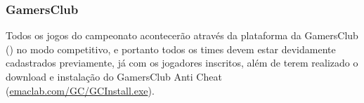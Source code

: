 \subsubsection{GamersClub}

Todos os jogos do campeonato acontecerão através da plataforma da GamersClub () no modo competitivo, e portanto todos os times devem estar devidamente cadastrados previamente, já com os jogadores inscritos, além de terem realizado o download e instalação do GamersClub Anti Cheat (\url{emaclab.com/GC/GCInstall.exe}).
